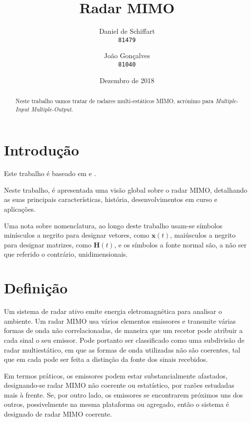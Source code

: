 \documentclass[purist,portuguese]{ist-report}
\author{Daniel de Schiffart \\ \texttt{81479} \and João Gonçalves \\ \texttt{81040}}
\title{Radar MIMO}
\subtitle{}
\date{Dezembro de 2018}
\begin{document}
\makecover


{ \tableofcontents}

\newpage

\begin{abstract}
	Neste trabalho vamos tratar de radares multi-estáticos MIMO, acrónimo para \textit{Multiple-Input Multiple-Output}.
\end{abstract}

\section{Introdução}

Este trabalho é baseado em \cite{davis2015mimo} e \cite{li2018mimo}.

Neste trabalho, é apresentada uma visão global sobre o radar MIMO, detalhando as suas principais características, história, desenvolvimentos em curso e aplicações.

Uma nota sobre nomenclatura, ao longo deste trabalho usam-se símbolos minísculos a negrito para designar vetores, como $\mathbf{x}(t)$, maiúsculos a negrito para designar matrizes, como $\mathbf{H}(t)$, e os símbolos a fonte normal são, a não ser que referido o contrário, unidimensionais.

\section{Definição}

Um sistema de radar ativo emite energia eletromagnética para analisar o ambiente.
Um radar MIMO usa vários elementos emissores e transmite várias formas de onda não correlacionadas, de maneira que um recetor pode atribuir a cada sinal o seu emissor. 
Pode portanto ser classificado como uma subdivisão de radar multiestático, em que as formas de onda utilizadas não são coerentes, tal que em cada pode ser feita a distinção da fonte dos sinais recebidos.

Em termos práticos, os emissores podem estar substancialmente afastados, designando-se radar MIMO não coerente ou estatístico, por razões estudadas mais à frente.
Se, por outro lado, os emissores se encontrarem próximos uns dos outros, possivelmente na mesma plataforma ou agregado, então o sistema é designado de radar MIMO coerente.
\end{document}
